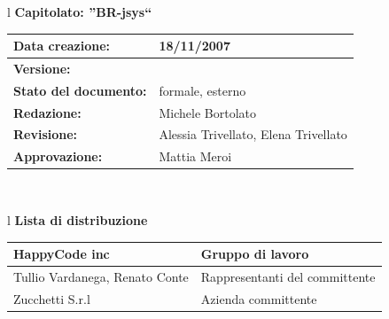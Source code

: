 \documentclass[11pt,titlepage,a4paper]{report}
\begin{document}
\begin{center}
\thispagestyle{plain}
\begin{table}[htbp]
\large{
\begin{tabular}{l}
\Large{\textbf{\textsf{Capitolato: ''BR-jsys``}}} \\
\begin{tabular}{||p{6cm}||p{6cm}||} \hline
\textbf{Data creazione:} & 18/11/2007 \\ \hline
\textbf{Versione:} & \lv \\ \hline
\textbf{Stato del documento:} & formale, esterno \\ \hline
\textbf{Redazione:} & Michele Bortolato \\ \hline
\textbf{Revisione:} & Alessia Trivellato, Elena Trivellato  \\ \hline
\textbf{Approvazione:}  & Mattia Meroi \\ \hline
\end{tabular} \\
\end{tabular}
}
\end{table}
\begin{table}[hbtp]
\large{
\begin{tabular}{l}
\Large{\textbf{\textsf{Lista di distribuzione}}} \\
\begin{tabular}{||p{6cm}||p{6cm}||} \hline
{HappyCode inc}& Gruppo di lavoro\\ \hline
{Tullio Vardanega, Renato Conte}& Rappresentanti del committente \\ \hline 
{Zucchetti S.r.l}& Azienda committente\\ \hline
\end{tabular} \\
\end{tabular}
}
\end{table}


\end{center}
\end{document}

